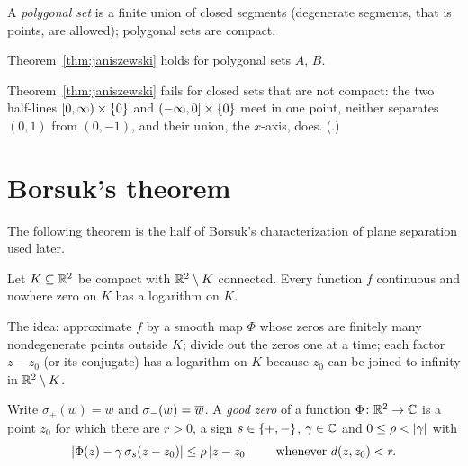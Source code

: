 
A \emph{polygonal set} is a finite union of closed segments (degenerate segments, that is points,
are allowed); polygonal sets are compact.

\begin{corollary}\label{cor:janiszewski-poly}
Theorem~\ref{thm:janiszewski} holds for polygonal sets $A$, $B$.
\end{corollary}


\begin{remark}
Theorem~\ref{thm:janiszewski} fails for closed sets that are not compact: the two half-lines
$[0,\infty)\times\left\{ 0 \right\}$ and $(-\infty,0]\times\left\{ 0 \right\}$ meet in one point, neither separates $(0,1)$
from $(0,-1)$, and their union, the $x$-axis, does. (.)
\end{remark}

\section{Borsuk's theorem}

The following theorem is the half of Borsuk's characterization of plane separation used later.

\begin{theorem}[Borsuk]\label{thm:borsuk}
Let $K\subseteq\mathbb{R}^2$ be compact with $\mathbb{R}^2\setminus K$ connected. Every function $f$ continuous and
nowhere zero on $K$ has a logarithm on $K$.
\end{theorem}

The idea: approximate $f$ by a smooth map $\Phi$ whose zeros are finitely many nondegenerate points
outside $K$; divide out the zeros one at a time; each factor $z-z_0$ (or its conjugate) has a
logarithm on $K$ because $z_0$ can be joined to infinity in $\mathbb{R}^2\setminus K$.

\begin{definition}\label{def:good-zero}
Write $\sigma_+(w)=w$ and $\sigma_-(w)=\overline{w}$. A \emph{good zero} of a function $\Phi\colon\mathbb{R}^2\to\mathbb{C}$
is a point $z_0$ for which there are $r>0$, a sign $s\in\left\{ +,- \right\}$, $\gamma\in\mathbb{C}$ and $0\le\rho<\left\lvert \gamma\right\rvert$
with
\[
\left\lvert \Phi(z)-\gamma\,\sigma_s(z-z_0)\right\rvert\le\rho\left\lvert z-z_0\right\rvert\qquad\text{whenever } d(z,z_0)<r.
\]
\end{definition}

